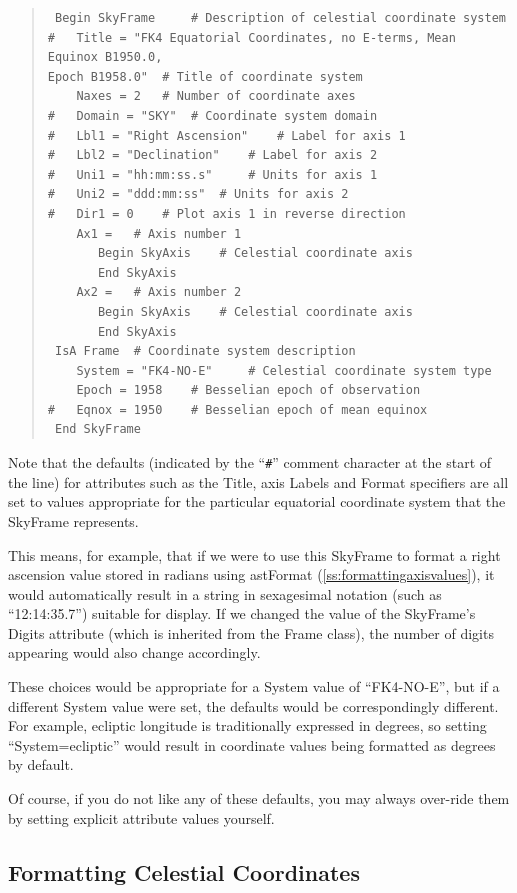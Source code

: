\documentclass[twoside,11pt]{article}
\newcommand{\htmlref}[2]{#1}
\newcommand{\secref}[1]{\S\ref{#1}}
\renewcommand{\secref}[1]{\ref{#1}}
\begin{document}
\begin{quote}
\begin{verbatim}
 Begin SkyFrame 	# Description of celestial coordinate system
#   Title = "FK4 Equatorial Coordinates, no E-terms, Mean Equinox B1950.0,
Epoch B1958.0" 	# Title of coordinate system
    Naxes = 2 	# Number of coordinate axes
#   Domain = "SKY" 	# Coordinate system domain
#   Lbl1 = "Right Ascension" 	# Label for axis 1
#   Lbl2 = "Declination" 	# Label for axis 2
#   Uni1 = "hh:mm:ss.s" 	# Units for axis 1
#   Uni2 = "ddd:mm:ss" 	# Units for axis 2
#   Dir1 = 0 	# Plot axis 1 in reverse direction
    Ax1 = 	# Axis number 1
       Begin SkyAxis 	# Celestial coordinate axis
       End SkyAxis
    Ax2 = 	# Axis number 2
       Begin SkyAxis 	# Celestial coordinate axis
       End SkyAxis
 IsA Frame 	# Coordinate system description
    System = "FK4-NO-E" 	# Celestial coordinate system type
    Epoch = 1958 	# Besselian epoch of observation
#   Eqnox = 1950 	# Besselian epoch of mean equinox
 End SkyFrame
\end{verbatim}
\end{quote}

Note that the defaults (indicated by the ``\verb?#?'' comment
character at the start of the line) for attributes such as the \htmlref{Title}{Title},
axis Labels and Format specifiers are all set to values appropriate
for the particular equatorial coordinate system that the SkyFrame
represents.

This means, for example, that if we were to use this SkyFrame to
format a right ascension value stored in radians using \htmlref{astFormat}{astFormat}
(\secref{ss:formattingaxisvalues}), it would automatically result in a
string in sexagesimal notation (such as ``12:14:35.7'') suitable for
display.  If we changed the value of the SkyFrame's Digits attribute
(which is inherited from the \htmlref{Frame}{Frame} class), the number of digits
appearing would also change accordingly.

These choices would be appropriate for a System value of ``FK4-NO-E'',
but if a different System value were set, the defaults would be
correspondingly different. For example, ecliptic longitude is
traditionally expressed in degrees, so setting ``System=ecliptic''
would result in coordinate values being formatted as degrees by
default.

Of course, if you do not like any of these defaults, you may always
over-ride them by setting explicit attribute values yourself.

\subsection{\label{ss:formattingskyaxisvalues}Formatting Celestial Coordinates}
\end{document}
